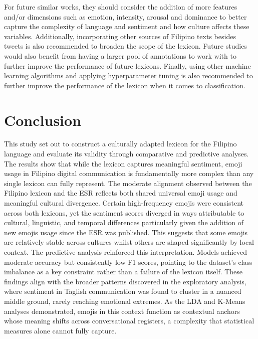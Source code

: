 For future similar works, they should consider the addition of more features and/or dimensions such as emotion, intensity, arousal and dominance to better capture the complexity of language and sentiment and how culture affects these variables. Additionally, incorporating other sources of Filipino texts besides tweets is also recommended to broaden the scope of the lexicon. Future studies would also benefit from having a larger pool of annotations to work with to further improve the performance of future lexicons. Finally, using other machine learning algorithms and applying hyperparameter tuning is also recommended to further improve the performance of the lexicon when it comes to classification.

\section{Conclusion}

This study set out to construct a culturally adapted lexicon for the Filipino language and evaluate its validity through comparative and predictive analyses. The results show that while the lexicon captures meaningful sentiment, emoji usage in Filipino digital communication is fundamentally more complex than any single lexicon can fully represent. The moderate alignment observed between the Filipino lexicon and the ESR reflects both shared universal emoji usage and meaningful cultural divergence. Certain high-frequency emojis were consistent across both lexicons, yet the sentiment scores diverged in ways attributable to cultural, linguistic, and temporal differences particularly given the addition of new emojis usage since the ESR was published. This suggests that some emojis are relatively stable across cultures whilst others are shaped significantly by local context.
The predictive analysis reinforced this interpretation. Models achieved moderate accuracy but consistently low F1 scores, pointing to the dataset's class imbalance as a key constraint rather than a failure of the lexicon itself. These findings align with the broader patterns discovered in the exploratory analysis, where sentiment in Taglish communication was found to cluster in a nuanced middle ground, rarely reaching emotional extremes. As the LDA and K-Means analyses demonstrated, emojis in this context function as contextual anchors whose meaning shifts across conversational registers, a complexity that statistical measures alone cannot fully capture.
